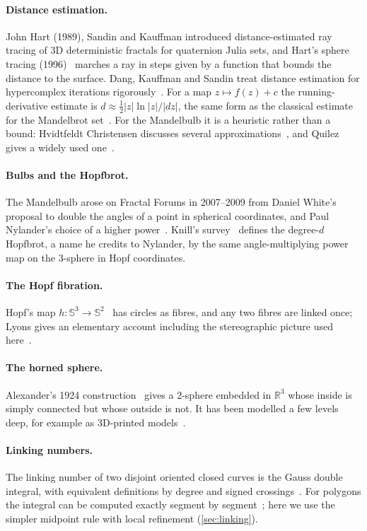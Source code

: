 \documentclass[11pt,a4paper]{article}
\theoremstyle{remark}
\newcommand{\R}{\mathbb{R}}
\newcommand{\Sph}{\mathbb{S}}
\begin{document}
\paragraph{Distance estimation.}
John Hart (1989), Sandin and Kauffman introduced distance-estimated ray tracing of 3D deterministic fractals for quaternion Julia sets,
and Hart's sphere tracing (1996)~\cite{hart1996} marches a ray in steps given by a function that bounds the distance to the surface.
Dang, Kauffman and Sandin treat distance estimation for hypercomplex iterations rigorously~\cite{dang2002}.  For a map $z\mapsto f(z)+c$
the running-derivative estimate is $d \approx \tfrac12 |z|\ln|z| / |dz|$, the same form as the classical estimate
for the Mandelbrot set~\cite{peitgen1986}.  For the Mandelbulb it is a heuristic rather than a bound: Hvidtfeldt Christensen
discusses several approximations~\cite{hvidtfeldt_de}, and Quilez gives a widely used one~\cite{quilez_mandelbulb,quilez_distance}.

\paragraph{Bulbs and the Hopfbrot.}
The Mandelbulb arose on Fractal Forums in 2007--2009 from Daniel White's proposal to double the angles of a point in spherical coordinates, and
Paul Nylander's choice of a higher power~\cite{white2009}.  Knill's survey~\cite{knill2023} defines the degree-$d$ Hopfbrot, a name he
credits to Nylander, by the same angle-multiplying power map on the 3-sphere in Hopf coordinates.

\paragraph{The Hopf fibration.}
Hopf's map $h\colon \Sph^3\to\Sph^2$~\cite{hopf1931} has circles as fibres, and any two fibres are linked once; Lyons gives an elementary account
including the stereographic picture used here~\cite{lyons2003}.

\paragraph{The horned sphere.}
Alexander's 1924 construction~\cite{alexander1924} gives a 2-sphere embedded in $\R^3$ whose inside is simply connected but whose outside is not.
It has been modelled a few levels deep, for example as 3D-printed models~\cite{grillet2022}.

\paragraph{Linking numbers.}
The linking number of two disjoint oriented closed curves is the Gauss double integral, with equivalent definitions by degree and signed crossings~\cite{ricca2011,rolfsen1976}.
For polygons the integral can be computed exactly segment by segment~\cite{klenin2000}; here we use the simpler midpoint rule with local refinement (\cref{sec:linking}).
\end{document}
